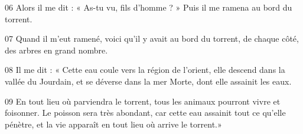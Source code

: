 
06 Alors il me dit : « As-tu vu, fils d’homme ? » Puis il me ramena au bord du torrent.

07 Quand il m’eut ramené, voici qu’il y avait au bord du torrent, de chaque côté, des arbres en grand nombre.

08 Il me dit : « Cette eau coule vers la région de l’orient, elle descend dans la vallée du Jourdain, et se déverse dans la mer Morte, dont elle assainit les eaux.

09 En tout lieu où parviendra le torrent, tous les animaux pourront vivre et foisonner. Le poisson sera très abondant, car cette eau assainit tout ce qu’elle pénètre, et la vie apparaît en tout lieu où arrive le torrent.»